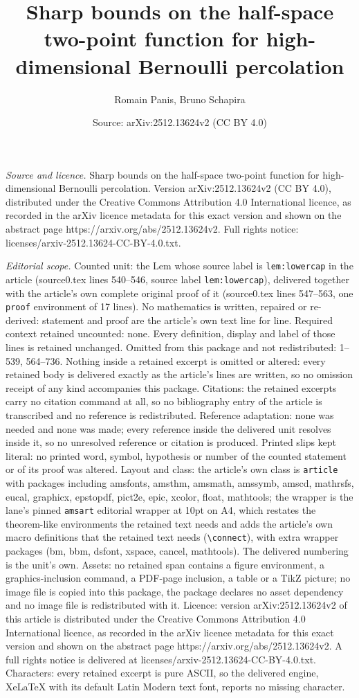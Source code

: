 \documentclass[10pt,a4paper]{amsart}
\title[Sharp bounds on the half-space two-point function for high-d]{Sharp bounds on the half-space two-point function for high-dimensional Bernoulli percolation}
\author{Romain Panis, Bruno Schapira}
\date{Source: arXiv:2512.13624v2 (CC BY 4.0)}
\begin{document}
\maketitle

\noindent\emph{Source and licence.} Sharp bounds on the half-space two-point function for high-dimensional Bernoulli percolation. Version arXiv:2512.13624v2 (CC BY 4.0), distributed under the Creative Commons Attribution 4.0 International licence, as recorded in the arXiv licence metadata for this exact version and shown on the abstract page https://arxiv.org/abs/2512.13624v2. Full rights notice: licenses/arxiv-2512.13624-CC-BY-4.0.txt.\par\smallskip

\noindent\textit{Editorial scope.} Counted unit: the Lem whose source label is \texttt{lem:lowercap} in the article (source0.tex lines 540--546, source label \texttt{lem:lowercap}), delivered together with the article's own complete original proof of it (source0.tex lines 547--563, one \texttt{proof} environment of 17 lines). No mathematics is written, repaired or re-derived: statement and proof are the article's own text line for line. Required context retained uncounted: none. Every definition, display and label of those lines is retained unchanged. Omitted from this package and not redistributed: 1--539, 564--736. Nothing inside a retained excerpt is omitted or altered: every retained body is delivered exactly as the article's lines are written, so no omission receipt of any kind accompanies this package. Citations: the retained excerpts carry no citation command at all, so no bibliography entry of the article is transcribed and no reference is redistributed. Reference adaptation: none was needed and none was made; every reference inside the delivered unit resolves inside it, so no unresolved reference or citation is produced. Printed slips kept literal: no printed word, symbol, hypothesis or number of the counted statement or of its proof was altered. Layout and class: the article's own class is \texttt{article} with packages including amsfonts, amsthm, amsmath, amssymb, amscd, mathrsfs, eucal, graphicx, epstopdf, pict2e, epic, xcolor, float, mathtools; the wrapper is the lane's pinned \texttt{amsart} editorial wrapper at 10pt on A4, which restates the theorem-like environments the retained text needs and adds the article's own macro definitions that the retained text needs (\texttt{\textbackslash connect}), with extra wrapper packages (bm, bbm, dsfont, xspace, cancel, mathtools). The delivered numbering is the unit's own. Assets: no retained span contains a figure environment, a graphics-inclusion command, a PDF-page inclusion, a table or a TikZ picture; no image file is copied into this package, the package declares no asset dependency and no image file is redistributed with it. Licence: version arXiv:2512.13624v2 of this article is distributed under the Creative Commons Attribution 4.0 International licence, as recorded in the arXiv licence metadata for this exact version and shown on the abstract page https://arxiv.org/abs/2512.13624v2. A full rights notice is delivered at licenses/arxiv-2512.13624-CC-BY-4.0.txt. Characters: every retained excerpt is pure ASCII, so the delivered engine, XeLaTeX with its default Latin Modern text font, reports no missing character.
\end{document}
